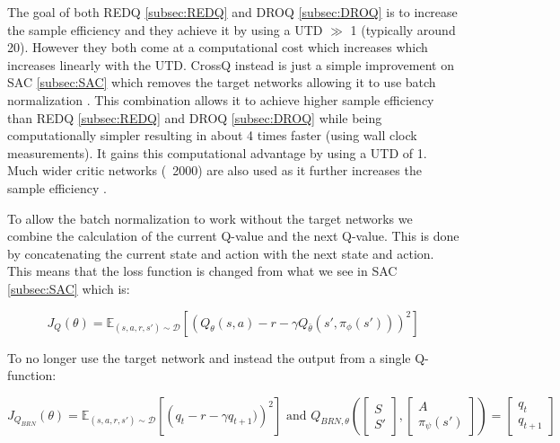 The goal of both REDQ \ref{subsec:REDQ} and DROQ \ref{subsec:DROQ} is to increase the sample efficiency and they achieve it by using a UTD $\gg$ 1 (typically around 20). However they both come at a computational cost which increases which increases linearly with the UTD. CrossQ \cite{bhattCrossQBatchNormalization2024} instead is just a simple improvement on SAC \ref{subsec:SAC} which removes the target networks allowing it to use batch normalization \cite{ioffeBatchRenormalizationReducing2017}. This combination allows it to achieve higher sample efficiency than REDQ \ref{subsec:REDQ} and DROQ \ref{subsec:DROQ} while being computationally simpler resulting in about 4 times faster (using wall clock measurements). It gains this computational advantage by using a UTD of 1. Much wider critic networks (~2000) are also used as it further increases the sample efficiency \cite{bhattCrossQBatchNormalization2024}.

To allow the batch normalization to work without the target networks we combine the calculation of the current Q-value and the next Q-value. This is done by concatenating the current state and action with the next state and action. This means that the loss function is changed from what we see in SAC \ref{subsec:SAC} which is:

\begin{equation}
    J_Q(\theta) = \mathbb{E}_{(s,a,r,s') \sim \mathcal{D}} \left[ \left( Q_{\theta}(s,a) - r - \gamma Q_{\bar{\theta}}(s',\pi_{\phi}(s')) \right)^2 \right]
\end{equation}

\noindent To no longer use the target network and instead the output from a single Q-function:

\begin{equation}
    J_{Q_{BRN}}(\theta) = \mathbb{E}_{(s,a,r,s') \sim \mathcal{D}} \left[ \left( q_t - r - \gamma q_{t+1}) \right)^2 \right] \text{ and } Q_{BRN,\theta}( \left[ \begin{matrix} S \\ S' \end{matrix}\right], \left[ \begin{matrix} A \\ \pi_\psi(s') \end{matrix}\right]) = \left[ \begin{matrix} q_t \\ q_{t+1} \end{matrix}\right]
\end{equation}

